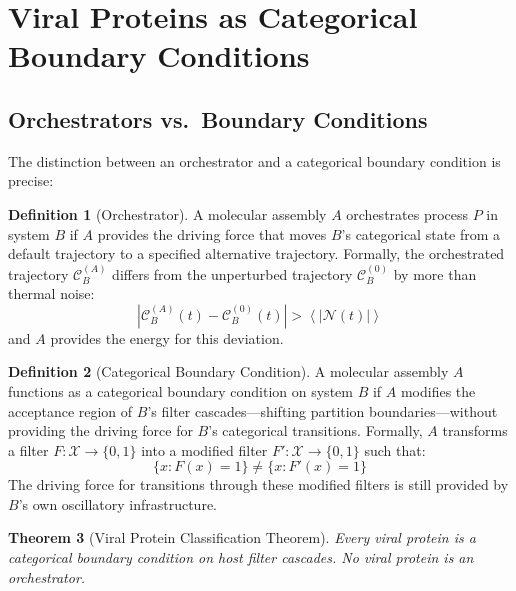 \documentclass[11pt,twocolumn,a4paper]{article}
\newtheorem{theorem}{Theorem}[section]
\theoremstyle{definition}
\newtheorem{definition}[theorem]{Definition}
\theoremstyle{remark}
\newcommand{\abs}[1]{\left|#1\right|}
\newcommand{\avg}[1]{\left\langle #1 \right\rangle}
\begin{document}
\section{Viral Proteins as Categorical Boundary Conditions}
\label{sec:boundary}

\subsection{Orchestrators vs.\ Boundary Conditions}

The distinction between an orchestrator and a categorical boundary condition is precise:

\begin{definition}[Orchestrator]
\label{def:orchestrator}
A molecular assembly $A$ orchestrates process $P$ in system $B$ if $A$ provides the driving force that moves $B$'s categorical state from a default trajectory to a specified alternative trajectory. Formally, the orchestrated trajectory $\mathcal{C}_B^{(A)}$ differs from the unperturbed trajectory $\mathcal{C}_B^{(0)}$ by more than thermal noise:
\begin{equation}
  \abs{\mathcal{C}_B^{(A)}(t) - \mathcal{C}_B^{(0)}(t)} > \avg{\abs{\mathcal{N}(t)}}
\end{equation}
and $A$ provides the energy for this deviation.
\end{definition}

\begin{definition}[Categorical Boundary Condition]
\label{def:BC}
A molecular assembly $A$ functions as a categorical boundary condition on system $B$ if $A$ modifies the acceptance region of $B$'s filter cascades---shifting partition boundaries---without providing the driving force for $B$'s categorical transitions. Formally, $A$ transforms a filter $F: \mathcal{X} \to \{0, 1\}$ into a modified filter $F': \mathcal{X} \to \{0, 1\}$ such that:
\begin{equation}
  \{x : F(x) = 1\} \neq \{x : F'(x) = 1\}
\end{equation}
The driving force for transitions through these modified filters is still provided by $B$'s own oscillatory infrastructure.
\end{definition}

\begin{theorem}[Viral Protein Classification Theorem]
\label{thm:viral_protein_class}
Every viral protein is a categorical boundary condition on host filter cascades. No viral protein is an orchestrator.
\end{theorem}
\end{document}
